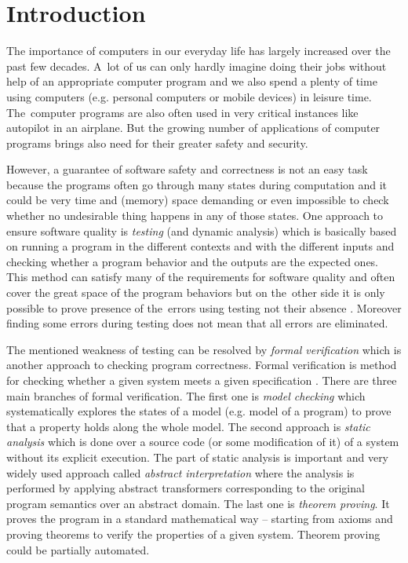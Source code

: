\documentclass[fleqn,11pt]{ExcelAtFIT} %
\affiliation{*%
  \href{mailto:xhrusk16@stud.fit.vutbr.cz}{xhrusk16@stud.fit.vutbr.cz},
  \textit{Faculty of Information Technology, Brno University of Technology}}
\begin{document}
\startdocument



\section{Introduction}

The importance of computers in our everyday life has largely increased over the past few decades.
A~lot of us can only hardly imagine doing their jobs without help of an appropriate computer program
and we also spend a plenty of time using computers (e.g. personal computers or mobile devices) in leisure time.
The~computer programs are also often used in very critical instances like autopilot in an airplane.
But the growing number of applications of computer programs brings also need for their greater safety and security.

However, a guarantee of software safety and correctness is not an easy task
because the programs often go through many states during computation
and it could be very time and (memory) space demanding or even impossible to check whether no undesirable thing
happens in any of those states.
One approach to ensure software quality is \emph{testing} (and dynamic analysis) which is basically based
on running a program in the different contexts and with the different inputs
and checking whether a program behavior and the outputs are the expected ones.
This method can satisfy many of the requirements for software quality and often cover the great space of the program behaviors
but on the~other side it is only possible to prove presence of the~errors using testing not their absence \cite{dijkstra}.
Moreover finding some errors during testing does not mean that all errors are eliminated.

The mentioned weakness of testing can be resolved by \emph{formal verification}
which is another approach to checking program correctness.
Formal verification is method for checking whether a given system meets a given specification \cite{fav:lecture}.
There are three main branches of formal verification.
The first one is \emph{model checking} which systematically explores the states of a model (e.g. model of a program) to
prove that a property holds along the whole model.
The second approach is \emph{static analysis} which is done over a source code (or some modification of it) of a system
without its explicit execution.
The part of static analysis is important and very widely used approach called \emph{abstract interpretation} where the analysis is performed by
applying abstract transformers corresponding to the original program semantics over an abstract domain.
The last one is \emph{theorem proving}.
It proves the program in a standard mathematical way -- starting from axioms and proving theorems to
verify the properties of a given system.
Theorem proving could be partially automated.
\end{document}
